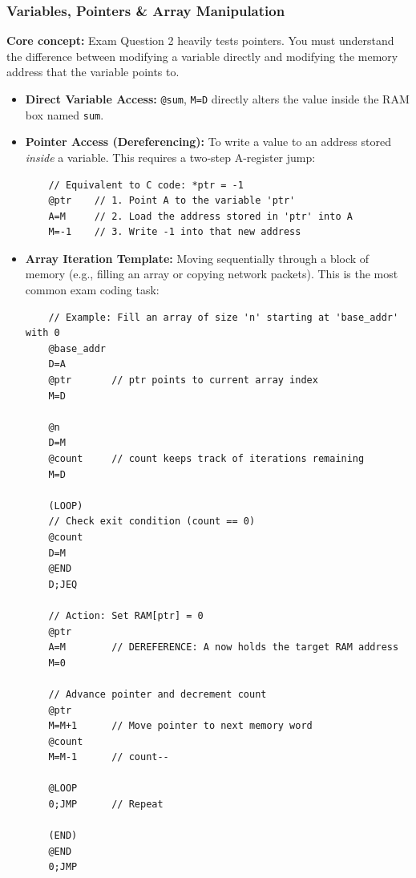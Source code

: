 \documentclass[12pt,a4paper]{article}
\begin{document}
\subsubsection*{Variables, Pointers \& Array Manipulation}
\textbf{Core concept:} Exam Question 2 heavily tests pointers. You must understand the difference between modifying a variable directly and modifying the memory address that the variable points to.
\begin{itemize}
    \item \textbf{Direct Variable Access:} \texttt{@sum}, \texttt{M=D} directly alters the value inside the RAM box named \texttt{sum}.
    \item \textbf{Pointer Access (Dereferencing):} To write a value to an address stored \textit{inside} a variable. This requires a two-step A-register jump:
    \begin{verbatim}
    // Equivalent to C code: *ptr = -1
    @ptr    // 1. Point A to the variable 'ptr'
    A=M     // 2. Load the address stored in 'ptr' into A
    M=-1    // 3. Write -1 into that new address
    \end{verbatim}
    \item \textbf{Array Iteration Template:} Moving sequentially through a block of memory (e.g., filling an array or copying network packets). This is the most common exam coding task:
    \begin{verbatim}
    // Example: Fill an array of size 'n' starting at 'base_addr' with 0
    @base_addr
    D=A
    @ptr       // ptr points to current array index
    M=D
    
    @n
    D=M
    @count     // count keeps track of iterations remaining
    M=D
    
    (LOOP)
    // Check exit condition (count == 0)
    @count
    D=M
    @END
    D;JEQ
    
    // Action: Set RAM[ptr] = 0
    @ptr
    A=M        // DEREFERENCE: A now holds the target RAM address
    M=0
    
    // Advance pointer and decrement count
    @ptr
    M=M+1      // Move pointer to next memory word
    @count
    M=M-1      // count--
    
    @LOOP
    0;JMP      // Repeat
    
    (END)
    @END
    0;JMP
    \end{verbatim}
\end{itemize}
\end{document}
